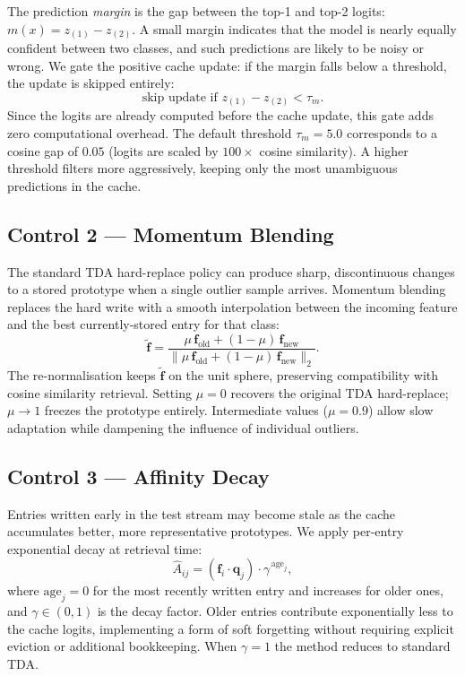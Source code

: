\documentclass[10pt,twocolumn,letterpaper]{article}
\begin{document}
The prediction \emph{margin} is the gap between the top-1 and top-2
logits: $m(x) = z_{(1)} - z_{(2)}$.
A small margin indicates that the model is nearly equally confident
between two classes, and such predictions are likely to be noisy or
wrong.
We gate the positive cache update: if the margin falls below a
threshold, the update is skipped entirely:
\begin{equation}
  \text{skip update if } z_{(1)} - z_{(2)} < \tau_m.
\end{equation}
Since the logits are already computed before the cache update, this
gate adds zero computational overhead.
The default threshold $\tau_m = 5.0$ corresponds to a cosine gap of
$0.05$ (logits are scaled by $100\times$ cosine similarity).
A higher threshold filters more aggressively, keeping only the most
unambiguous predictions in the cache.

\subsection{Control 2 --- Momentum Blending}
\label{subsec:momentum}

The standard TDA hard-replace policy can produce sharp, discontinuous
changes to a stored prototype when a single outlier sample arrives.
Momentum blending replaces the hard write with a smooth interpolation
between the incoming feature and the best currently-stored entry for
that class:
\begin{equation}
  \tilde{\mathbf{f}} =
    \frac{
      \mu\,\mathbf{f}_\text{old} + (1-\mu)\,\mathbf{f}_\text{new}
    }{
      \|\mu\,\mathbf{f}_\text{old} + (1-\mu)\,\mathbf{f}_\text{new}\|_2
    }.
\end{equation}
The re-normalisation keeps $\tilde{\mathbf{f}}$ on the unit sphere,
preserving compatibility with cosine similarity retrieval.
Setting $\mu = 0$ recovers the original TDA hard-replace;
$\mu \to 1$ freezes the prototype entirely.
Intermediate values ($\mu = 0.9$) allow slow adaptation while
dampening the influence of individual outliers.

\subsection{Control 3 --- Affinity Decay}
\label{subsec:decay}

Entries written early in the test stream may become stale as the
cache accumulates better, more representative prototypes.
We apply per-entry exponential decay at retrieval time:
\begin{equation}
  \hat{A}_{ij} =
    (\mathbf{f}_i \cdot \mathbf{q}_j) \cdot \gamma^{\,\text{age}_j},
\end{equation}
where $\text{age}_j = 0$ for the most recently written entry and
increases for older ones, and $\gamma \in (0, 1)$ is the decay factor.
Older entries contribute exponentially less to the cache logits,
implementing a form of soft forgetting without requiring explicit
eviction or additional bookkeeping.
When $\gamma = 1$ the method reduces to standard TDA.
\end{document}
